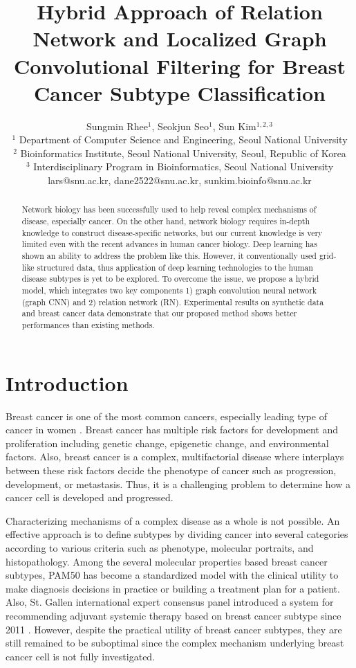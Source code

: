 \documentclass{article}
\title{Hybrid Approach of Relation Network and Localized Graph Convolutional Filtering for Breast Cancer Subtype Classification}
\author{
Sungmin Rhee$^1$, 
Seokjun Seo$^1$, 
Sun Kim$^{1,2,3}$ 
\\ 
$^1$ Department of Computer Science and Engineering, Seoul National University\\
$^2$ Bioinformatics Institute, Seoul National University, Seoul, Republic of Korea\\
$^3$ Interdisciplinary Program in Bioinformatics, Seoul National University\\
lars@snu.ac.kr,
dane2522@snu.ac.kr,
sunkim.bioinfo@snu.ac.kr
}
\begin{document}
\maketitle

\begin{abstract}
Network biology has been successfully used to help reveal complex mechanisms of disease, especially cancer. On the other hand, network biology requires in-depth knowledge to construct disease-specific networks, but our current knowledge is very limited even with the recent advances in human cancer biology. Deep learning has shown an ability to address the problem like this. However, it conventionally used grid-like structured data, thus application of deep learning technologies to the human disease subtypes is yet to be explored. To overcome the issue, we propose a hybrid model, which integrates two key components 1) graph convolution neural network (graph CNN) and 2) relation network (RN). Experimental results on synthetic data and breast cancer data demonstrate that our proposed method shows better performances than existing methods.
\end{abstract}

\section{Introduction}

Breast cancer is one of the most common cancers, especially leading type of cancer in women  \cite{cancer2012comprehensive}. Breast cancer has multiple risk factors for development and proliferation including genetic change, epigenetic change, and environmental factors. Also, breast cancer is a complex, multifactorial disease where interplays between these risk factors decide the phenotype of cancer such as progression, development, or metastasis. Thus, it is a challenging problem to determine how a cancer cell is developed and progressed.


Characterizing mechanisms of a complex disease as a whole is not possible. An effective approach is to define subtypes by dividing cancer into several categories according to various criteria such as phenotype, molecular portraits, and histopathology.
Among the several molecular properties based breast cancer subtypes, PAM50 \cite{parker2009supervised} has become a standardized model with the clinical utility to make diagnosis decisions in practice or building a treatment plan for a patient. Also, St. Gallen international expert consensus panel introduced a system for recommending adjuvant systemic therapy based on breast cancer subtype since 2011 \cite{goldhirsch2013personalizing}. However, despite the practical utility of breast cancer subtypes, they are still remained to be suboptimal since the complex mechanism underlying breast cancer cell is not fully investigated.
\end{document}
